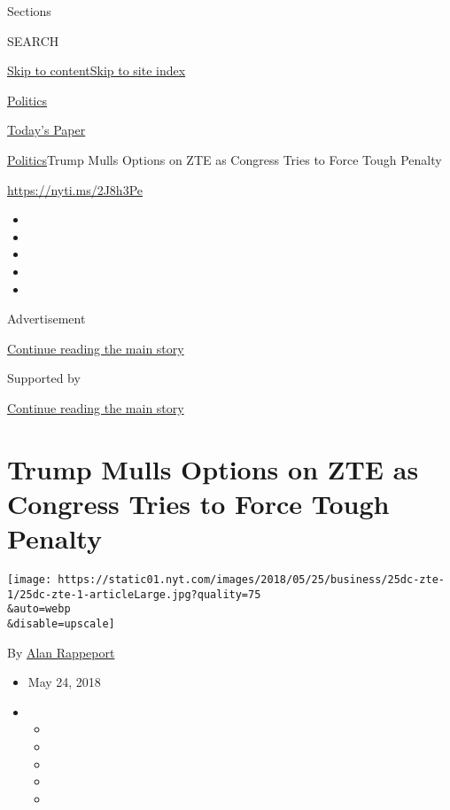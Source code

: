 Sections

SEARCH

\protect\hyperlink{site-content}{Skip to
content}\protect\hyperlink{site-index}{Skip to site index}

\href{https://www.nytimes.com/section/politics}{Politics}

\href{https://myaccount.nytimes.com/auth/login?response_type=cookie\&client_id=vi}{}

\href{https://www.nytimes.com/section/todayspaper}{Today's Paper}

\href{/section/politics}{Politics}\textbar{}Trump Mulls Options on ZTE
as Congress Tries to Force Tough Penalty

\url{https://nyti.ms/2J8h3Pe}

\begin{itemize}
\item
\item
\item
\item
\item
\end{itemize}

Advertisement

\protect\hyperlink{after-top}{Continue reading the main story}

Supported by

\protect\hyperlink{after-sponsor}{Continue reading the main story}

\hypertarget{trump-mulls-options-on-zte-as-congress-tries-to-force-tough-penalty}{%
\section{Trump Mulls Options on ZTE as Congress Tries to Force Tough
Penalty}\label{trump-mulls-options-on-zte-as-congress-tries-to-force-tough-penalty}}

\texttt{[image: https://static01.nyt.com/images/2018/05/25/business/25dc-zte-1/25dc-zte-1-articleLarge.jpg?quality=75\\\&auto=webp\\\&disable=upscale]}

By \href{https://www.nytimes.com/by/alan-rappeport}{Alan Rappeport}

\begin{itemize}
\item
  May 24, 2018
\item
  \begin{itemize}
  \item
  \item
  \item
  \item
  \item
  \end{itemize}
\end{itemize}

